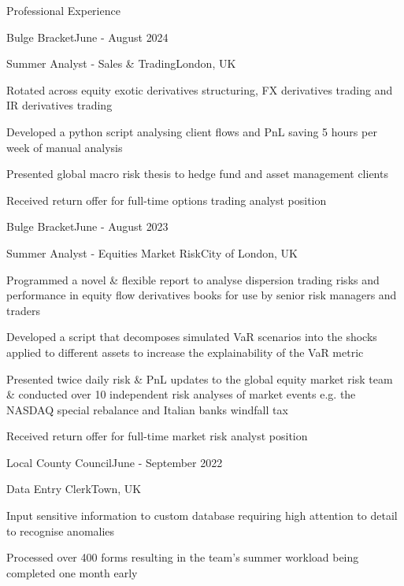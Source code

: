 \documentclass[10pt,a4paper]{CV}
\begin{document}
\begin{Section}{Professional Experience}
    \begin{Institution}{Bulge Bracket}{June - August 2024}
        \begin{Position}{Summer Analyst - Sales \& Trading}{London, UK}
            \item Rotated across equity exotic derivatives structuring, FX derivatives trading and IR derivatives trading
            \item Developed a python script analysing client flows and PnL saving 5 hours per week of manual analysis
            \item Presented global macro risk thesis to hedge fund and asset management clients
            \item Received return offer for full-time options trading analyst position
        \end{Position}
    \end{Institution}
    
    \begin{Institution}{Bulge Bracket}{June - August 2023}
        \begin{Position}{Summer Analyst - Equities Market Risk}{City of London, UK}
            \item Programmed a novel \& flexible report to analyse dispersion trading risks and performance in equity flow derivatives books for use by senior risk managers and traders
            \item Developed a script that decomposes simulated VaR scenarios into the shocks applied to different assets to increase the explainability of the VaR metric
            \item Presented twice daily risk \& PnL updates to the global equity market risk team \& conducted over 10 independent risk analyses of market events e.g. the NASDAQ special rebalance and Italian banks windfall tax
            \item Received return offer for full-time market risk analyst position
        \end{Position}
    \end{Institution}
    
    \begin{Institution}{Local County Council}{June - September 2022}       \begin{Position}{Data Entry Clerk}{Town, UK}
            \item Input sensitive information to custom database requiring high attention to detail to recognise anomalies
            \item Processed over 400 forms resulting in the team’s summer workload being completed one month early
        \end{Position}
    \end{Institution}
\end{Section}
\end{document}
